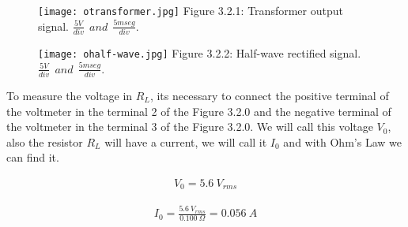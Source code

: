 \begin{multicols}{2}
\begin{figure}[H]
\texttt{[image: otransformer.jpg]}
\centering \linebreak \linebreak Figure 3.2.1: Transformer output signal.
\linebreak \linebreak $\frac{5 V}{div}\ \ and\ \ \frac{5mseg}{div}$.
\end{figure}

\begin{figure}[H]
\texttt{[image: ohalf-wave.jpg]}
\centering \linebreak \linebreak Figure 3.2.2: Half-wave rectified signal.
\linebreak \linebreak $\frac{5 V}{div}\ \ and\ \ \frac{5mseg}{div}$.
\end{figure}
\end{multicols}

{\bfseries\itshape\color{OliveGreen}{Observation:}} {\bfseries\itshape\color{OliveGreen}{In the oscilloscope we are only using the channel 1 in D.C option.}}  \hfill \break

To measure the voltage in {\bfseries\itshape $R_{L}$}, its necessary to connect the positive terminal of the voltmeter in the terminal 2 of the Figure 3.2.0 and the negative terminal of the voltmeter in the terminal 3 of the Figure 3.2.0. We will call this voltage $V_{0}$, also the resistor $R_{L}$ will have a current, we will call it $I_{0}$ and with Ohm's Law we can find it.

\begin{ceqn}
\begin{align}
V_{0} = 5.6\ V_{rms} 
\end{align}
\end{ceqn} \hfill

{\bfseries\itshape\color{OliveGreen}{Observation:}} {\bfseries\itshape{}} \hfill \break \break

{\bfseries\itshape{}} \hfill \break

\begin{ceqn}
\begin{align}
I_{0} = \frac{5.6\ V_{rms}}{0.100\ \Omega} = 0.056\ A
\end{align}
\end{ceqn} \hfill 

